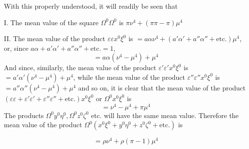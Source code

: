 With this properly understood, it will readily be seen that

I. The mean value of the square \(\Omega^0\Omega^0\) is \(\pi\nu^4+(\pi\pi-\pi)\mu^4\)

II. The mean value of the product \(\varepsilon\varepsilon x^0\xi^0\) is \(=a\alpha\nu^4+(a'\alpha'+a''\alpha''+\text{etc.})\mu^4\), or, since \(a\alpha+a'\alpha'+a''\alpha''+\text{etc.}=1\),
\[
=a\alpha(\nu^4-\mu^4)+\mu^4
\]
And since, similarly, the mean value of the product \(\varepsilon'\varepsilon'x^0\xi^0\) is \(=a'\alpha'(\nu^4-\mu^4)+\mu^4\), while the mean value of the product \(\varepsilon''\varepsilon''x^0\xi^0\) is \(=a''\alpha''(\nu^4-\mu^4)+\mu^4\) and so on, it is clear that the mean value of the product \((\varepsilon\varepsilon+\varepsilon'\varepsilon'+\varepsilon''\varepsilon''+\text{etc.})x^0\xi^0\) or \(\Omega^0x^0\xi^0\) is
\[
=\nu^4-\mu^4+\pi\mu^4
\]
\begingroup\setlength{\rightskip}{0pt plus 2em}\noindent The products \(\Omega^0y^0\eta^0,\allowbreak\Omega^0z^0\zeta^0\) etc. will have the same mean value. Therefore the mean value of the product \(\Omega^0(x^0\xi^0+y^0\eta^0+z^0\zeta^0+\text{etc.})\) is\par\endgroup
\[
=\rho\nu^4+\rho(\pi-1)\mu^4
\]

